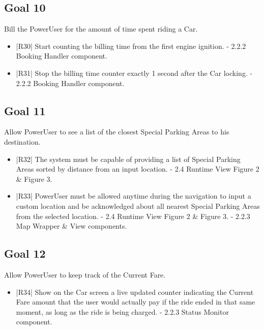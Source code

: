 \subsection {Goal 10} Bill the PowerUser for the amount of time spent riding a Car.
\begin{itemize}
 \item |R30| Start counting the billing time from the first engine ignition.
    \newline - 2.2.2 Booking Handler component.
 \item |R31| Stop the billing time counter exactly 1 second after the Car locking.
    \newline - 2.2.2 Booking Handler component.
\end{itemize}

\subsection {Goal 11} Allow PowerUser to see a list of the closest Special Parking Areas to his destination.
\begin{itemize}
 \item |R32| The system must be capable of providing a list of Special Parking Areas sorted
by distance from an input location.
     \newline - 2.4 Runtime View Figure 2 \& Figure 3.

 \item |R33| PowerUser must be allowed anytime during the navigation to input a custom
location and be acknowledged about all nearest Special Parking Areas from
the selected location.
    \newline - 2.4 Runtime View Figure 2 \& Figure 3.
    \newline - 2.2.3 Map Wrapper \& View components.
\end{itemize}

\subsection {Goal 12} Allow PowerUser to keep track of the Current Fare.
\begin{itemize}
 \item |R34| Show on the Car screen a live updated counter indicating the Current Fare
amount that the user would actually pay if the ride ended in that same moment,
as long as the ride is being charged.
    \newline - 2.2.3 Status Monitor component.
\end{itemize}

